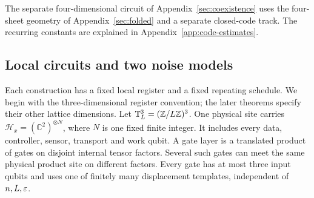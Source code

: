 The separate four-dimensional circuit of Appendix~\ref{sec:coexistence}
uses the four-sheet geometry of Appendix~\ref{sec:folded} and a separate
closed-code track. The recurring constants are explained in
Appendix~\ref{app:code-estimates}.

\subsection{Local circuits and two noise models}\label{s:local-circuits}
Each construction has a fixed local register and a fixed repeating schedule. We begin with the three-dimensional register convention; the later theorems specify their other lattice dimensions.
Let \(\mathbb T_L^3=(\mathbb Z/L\mathbb Z)^3\). One physical site carries
\(\mathcal H_x=(\mathbb C^2)^{\otimes N}\), where \(N\) is one fixed
finite integer. It includes every data, controller, sensor, transport
and work qubit. A gate layer is a translated product of gates on
disjoint internal tensor factors. Several such gates can meet the same
physical product site on different factors. Every gate has at most
three input qubits and uses one of finitely many displacement templates, independent of \(n,L,\varepsilon\).

